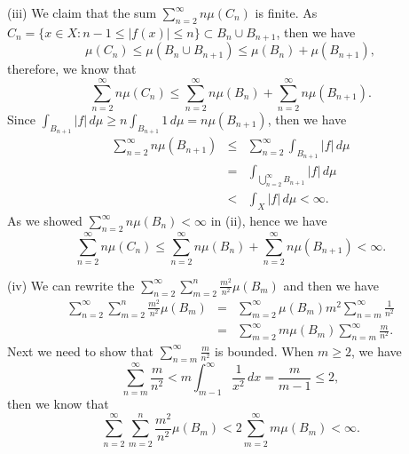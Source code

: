 \documentclass[12pt]{article}
\begin{document}
(iii) We claim that the sum $\sum_{n=2}^{\infty} n \mu(C_{n})$ is finite. As $C_{n} = \{x \in X : n-1 \leq |f(x)| \leq n \} \subset B_{n} \cup B_{n+1}$, then we have
\begin{equation*}
    \mu(C_{n}) \leq \mu(B_{n} \cup B_{n+1}) \leq \mu(B_{n}) + \mu(B_{n+1}),
\end{equation*}
therefore, we know that
\begin{equation*}
    \sum_{n=2}^{\infty} n \mu(C_{n}) \leq \sum_{n=2}^{\infty} n \mu(B_{n}) +  \sum_{n=2}^{\infty} n \mu (B_{n+1}).
\end{equation*}
Since $\int_{B_{n+1}}^{} |f| \, d \mu  \geq n \int_{B_{n+1}}^{} 1 \, d \mu = n \mu(B_{n+1})$, then we have
\begin{eqnarray*}
    \sum_{n=2}^{\infty} n \mu(B_{n+1}) & \leq & \sum_{n=2}^{\infty} \int_{B_{n+1}}^{} |f| \, d \mu \\
    & = & \int_{\bigcup_{n=2}^{\infty} B_{n+1}}^{} |f| \, d \mu \\
    & < & \int_{X}^{} |f| \, d \mu < \infty.
\end{eqnarray*}
As we showed $\sum_{n=2}^{\infty} n \mu(B_{n}) < \infty$ in (ii), hence we have
\begin{equation*}
    \sum_{n=2}^{\infty} n \mu(C_{n}) \leq \sum_{n=2}^{\infty} n \mu(B_{n}) +  \sum_{n=2}^{\infty} n \mu (B_{n+1}) < \infty.
\end{equation*}

(iv) We can rewrite the $\sum_{n=2}^{\infty} \sum_{m=2}^{n} \frac{m^{2}}{n^{2}} \mu(B_{m}) $ and then we have
\begin{eqnarray*}
    \sum_{n=2}^{\infty} \sum_{m=2}^{n} \frac{m^{2}}{n^{2}} \mu(B_{m}) & = & \sum_{m=2}^{\infty} \mu(B_{m}) m^{2} \sum_{n=m}^{\infty} \frac{1}{n^{2}}  \\
    & = & \sum_{m=2}^{\infty} m \mu(B_{m}) \sum_{n=m}^{\infty} \frac{m}{n^{2}}.
\end{eqnarray*}
Next we need to show that $\sum_{n=m}^{\infty} \frac{m}{n^{2}}$ is bounded. When $m \geq 2$, we have
\begin{equation*}
    \sum_{n=m}^{\infty} \frac{m}{n^{2}} < m \int_{m-1}^{\infty} \frac{1}{x^{2}} \, d x = \frac{m}{m-1} \leq 2,
\end{equation*}
then we know that
\begin{equation*}
    \sum_{n=2}^{\infty} \sum_{m=2}^{n} \frac{m^{2}}{n^{2}} \mu(B_{m}) < 2 \sum_{m=2}^{\infty} m \mu(B_{m}) < \infty.
\end{equation*}
\end{document}
